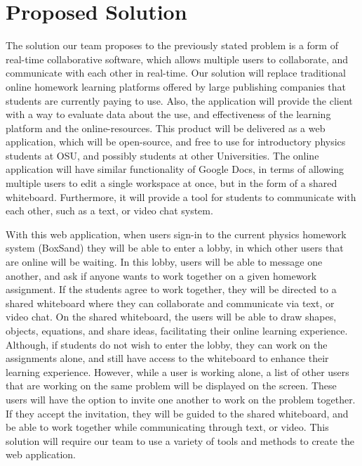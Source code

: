 \documentclass[onecolumn, draftclsnofoot,10pt, compsoc]{IEEEtran}
\begin{document}
\section{Proposed Solution}
The solution our team proposes to the previously stated problem is a form of real-time collaborative software, which allows multiple users to collaborate, and communicate with each other in real-time. Our solution will replace traditional online homework learning platforms offered by large publishing companies that students are currently paying to use. Also, the application will provide the client with a way to evaluate data about the use, and effectiveness of the learning platform and the online-resources. This product will be delivered as a web application, which will be open-source, and free to use for introductory physics students at OSU, and possibly students at other Universities. The online application will have similar functionality of Google Docs, in terms of allowing multiple users to edit a single workspace at once, but in the form of a shared whiteboard. Furthermore, it will provide a tool for students to communicate with each other, such as a text, or video chat system.

With this web application, when users sign-in to the current physics homework system (BoxSand) they will be able to enter a lobby, in which other users that are online will be waiting. In this lobby, users will be able to message one another, and ask if anyone wants to work together on a given homework assignment. If the students agree to work together, they will be directed to a shared whiteboard where they can collaborate and communicate via text, or video chat. On the shared whiteboard, the users will be able to draw shapes, objects, equations, and share ideas, facilitating their online learning experience. Although, if students do not wish to enter the lobby, they can work on the assignments alone, and still have access to the whiteboard to enhance their learning experience. However, while a user is working alone, a list of other users that are working on the same problem will be displayed on the screen. These users will have the option to invite one another to work on the problem together. If they accept the invitation, they will be guided to the shared whiteboard, and be able to work together while communicating through text, or video. This solution will require our team to use a variety of tools and methods to create the web application.
\end{document}
